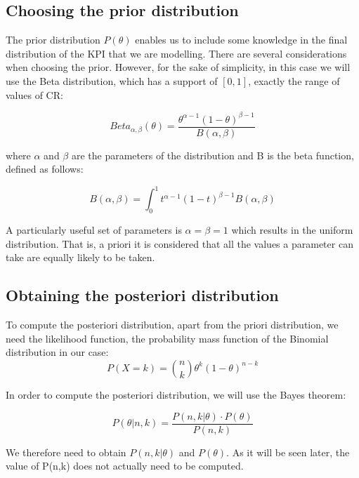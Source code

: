 \documentclass[11pt, a4wide]{article}   	%
\begin{document}
\subsection{Choosing the prior distribution}
The prior distribution $P(\theta)$ enables us to include some knowledge in the final distribution of the KPI that we are modelling. There are several considerations when choosing the prior. However, for the sake of simplicity, in this case we will use the Beta distribution, which has a support of $[0,1]$, exactly the range of values of CR:

\begin{equation}
Beta_{\alpha,\beta}(\theta) = \frac{\theta^{\alpha-1}(1-\theta)^{\beta-1}}{B(\alpha,\beta)}
\end{equation}


where $\alpha$ and $\beta$ are the parameters of the distribution and B is the beta function, defined as follows:

\begin{equation}
B(\alpha,\beta) = \int_0^1t^{\alpha-1}(1-t)^{\beta-1}{B(\alpha,\beta)}
\end{equation}


 A particularly useful set of parameters is $\alpha=\beta=1$ which results in the uniform distribution. That is, a priori it is considered that all the values a parameter can take are equally likely to be taken.



\subsection{Obtaining the posteriori distribution}

To compute the posteriori distribution, apart from the priori distribution, we need the likelihood function, the probability mass function of the Binomial distribution in our case:
\begin{equation}
P(X=k)=\binom{n}{k}\theta^k(1-\theta)^{n-k}
\end{equation}

In order to compute the posteriori distribution, we will use the Bayes theorem:


\begin{equation}
\label{eq:bayesconvr}
P(\theta|n,k) = \frac{P(n,k|\theta)\cdot P(\theta)}{P(n,k)}
\end{equation}

We therefore need to obtain $P(n,k|\theta)$ and $P(\theta)$. As it will be seen later, the value of P(n,k) does not actually need to be computed.
\end{document}
